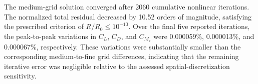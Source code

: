 The medium-grid solution converged after 2060 cumulative nonlinear
iterations. The normalized total residual decreased by 10.52 orders of
magnitude, satisfying the prescribed criterion of $R/R_0\leq10^{-10}$.
Over the final five reported iterations, the peak-to-peak variations in
$C_L$, $C_D$, and $C_{M_z}$ were 0.000059\%, 0.000013\%, and
0.000067\%, respectively. These variations were substantially smaller
than the corresponding medium-to-fine grid differences, indicating that
the remaining iterative error was negligible relative to the assessed
spatial-discretization sensitivity.

